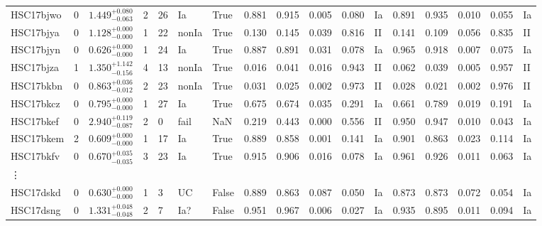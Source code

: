 \documentclass[useamsfonts]{pasj01}
\begin{document}
\begin{table}[htbp]
{\begin{tabular}{p{4.5em}p{1.2em}p{4.0em}p{2.1em}|p{0.6em}p{1.8em}p{3.0em}|p{2.9em}|p{1.2em}p{1.2em}p{1.2em}p{0.6em}|p{2.9em}|p{1.2em}p{1.2em}p{1.2em}p{0.6em}}
HSC17bjwo &     0 &    $1.449_{-0.063}^{+0.080}$ &         2 &   26 &     Ia &     True &    0.881 &    0.915 &    0.005 &    0.080 &      Ia &    0.891 &    0.935 &    0.010 &    0.055 &      Ia \\
HSC17bjya &     0 &    $1.128_{-0.000}^{+0.000}$ &         1 &   22 &  nonIa &     True &    0.130 &    0.145 &    0.039 &    0.816 &      II &    0.141 &    0.109 &    0.056 &    0.835 &      II \\
HSC17bjyn &     0 &    $0.626_{-0.000}^{+0.000}$ &         1 &   24 &     Ia &     True &    0.887 &    0.891 &    0.031 &    0.078 &      Ia &    0.965 &    0.918 &    0.007 &    0.075 &      Ia \\
HSC17bjza &     1 &    $1.350_{-0.156}^{+1.142}$ &         4 &   13 &  nonIa &     True &    0.016 &    0.041 &    0.016 &    0.943 &      II &    0.062 &    0.039 &    0.005 &    0.957 &      II \\
HSC17bkbn &     0 &    $0.863_{-0.012}^{+0.036}$ &         2 &   23 &  nonIa &     True &    0.031 &    0.025 &    0.002 &    0.973 &      II &    0.028 &    0.021 &    0.002 &    0.976 &      II \\
HSC17bkcz &     0 &    $0.795_{-0.000}^{+0.000}$ &         1 &   27 &     Ia &     True &    0.675 &    0.674 &    0.035 &    0.291 &      Ia &    0.661 &    0.789 &    0.019 &    0.191 &      Ia \\
HSC17bkef &     0 &    $2.940_{-0.087}^{+0.119}$ &         2 &    0 &   fail &    NaN &    0.219 &    0.443 &    0.000 &    0.556 &      II &    0.950 &    0.947 &    0.010 &    0.043 &      Ia \\
HSC17bkem &     2 &    $0.609_{-0.000}^{+0.000}$ &         1 &   17 &     Ia &     True &    0.889 &    0.858 &    0.001 &    0.141 &      Ia &    0.901 &    0.863 &    0.023 &    0.114 &      Ia \\
HSC17bkfv &     0 &    $0.670_{-0.035}^{+0.035}$ &         3 &   23 &     Ia &     True &    0.915 &    0.906 &    0.016 &    0.078 &      Ia &    0.961 &    0.926 &    0.011 &    0.063 &      Ia \\
\vdots & & & & & & & & & & & & & & & &\\
HSC17dskd &     0 &    $0.630_{-0.000}^{+0.000}$ &         1 &    3 &  UC &   False &    0.889 &    0.863 &    0.087 &    0.050 &      Ia &    0.873 &    0.873 &    0.072 &    0.054 &      Ia \\
HSC17dsng &     0 &    $1.331_{-0.048}^{+0.048}$ &         2 &    7 &    Ia? &   False &    0.951 &    0.967 &    0.006 &    0.027 &      Ia &    0.935 &    0.895 &    0.011 &    0.094 &      Ia \\

\end{tabular}}
\end{table}
\end{document}
